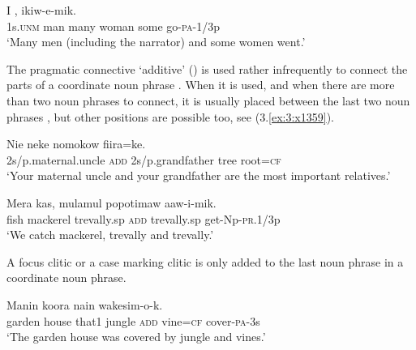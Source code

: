 \ea%
\label{ex:4:x811}
\gll I   ,     ikiw-e-mik. \\
  1s.\textsc{unm}  man  many  woman  some  go-\textsc{pa}-1/3p    \\
\glt`Many men (including the narrator) and some women went.'
\z

The pragmatic connective  `additive' () is used rather infrequently to connect the parts of a coordinate noun phrase . When it is used, and when there are more than two noun phrases to connect, it is usually placed between the last two noun phrases , but other positions are possible too, see (3.\ref{ex:3:x1359}). 
%
%

\ea%
\label{ex:4:x812}
\gll Nie    neke  nomokow  fiira=ke. \\
    2s/p.maternal.uncle  \textsc{add}  2s/p.grandfather  tree  root=\textsc{cf}  \\
\glt`Your maternal uncle and your grandfather are the most important relatives.'
\z

\ea%
\label{ex:4:x814}
\gll Mera  kas,  mulamul    popotimaw  aaw-i-mik. \\
   fish  mackerel  trevally.sp  \textsc{add}  trevally.sp  get-Np-\textsc{pr}.1/3p   \\
\glt`We catch mackerel,   trevally and   trevally.'
\z

A focus clitic  or a case marking clitic  is only added to the last noun phrase in a coordinate noun phrase.

\ea%
\label{ex:4:x893}
\gll Manin  koora  nain      wakesim-o-k. \\
     garden  house  that1  jungle  \textsc{add}  vine=\textsc{cf}  cover-\textsc{pa}-3s \\
\glt`The garden house was covered by jungle and vines.'
\z

